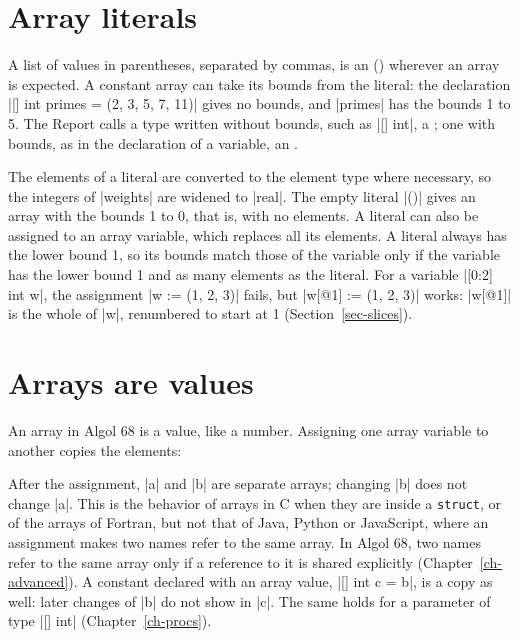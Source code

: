 
\section{Array literals}\label{sec-displays}

A list of values in parentheses, separated by commas, is an  () wherever an array is expected. A constant
array can take its bounds from the literal: the declaration
\code|[] int primes = (2, 3, 5, 7, 11)| gives no bounds, and
\code|primes| has the bounds 1 to 5. The Report calls a type written
without bounds, such as \code|[] int|, a ; one with
bounds, as in the declaration of a variable, an .


The elements of a literal are converted to the element type where
necessary, so the integers of \code|weights| are widened to \code|real|.
The empty literal \code|()| gives an array with the bounds 1 to 0, that
is, with no elements. A literal can also be assigned to an array
variable, which replaces all its elements. A literal always has the lower
bound 1, so its bounds match those of the variable only if the variable
has the lower bound 1 and as many elements as the literal. For a variable
\code|[0:2] int w|, the assignment \code|w := (1, 2, 3)| fails, but
\code|w[@1] := (1, 2, 3)| works: \code|w[@1]| is the whole of \code|w|,
renumbered to start at 1 (Section~\ref{sec-slices}).

\section{Arrays are values}\label{sec-array-values}

An array in Algol 68 is a value, like a number. Assigning one array
variable to another copies the elements:


After the assignment, \code|a| and \code|b| are separate arrays; changing
\code|b| does not change \code|a|. This is the behavior of arrays in C
when they are inside a \texttt{struct}, or of the arrays of Fortran, but
not that of Java, Python or JavaScript, where an assignment makes two
names refer to the same array. In Algol 68, two names refer to the same
array only if a reference to it is shared explicitly (Chapter~\ref{ch-advanced}).
A constant declared with an array value, \code|[] int c = b|, is a copy
as well: later changes of \code|b| do not show in \code|c|. The same holds
for a parameter of type \code|[] int| (Chapter~\ref{ch-procs}).

